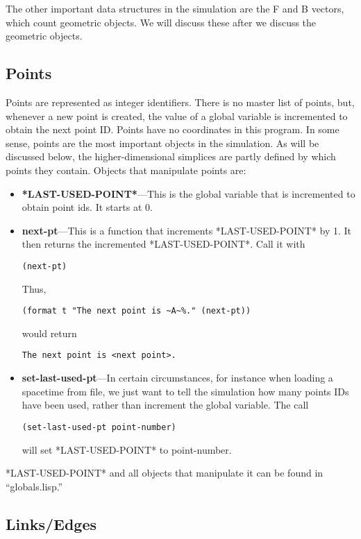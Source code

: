 \documentclass[12pt]{article}
\begin{document}
The other important data structures in the simulation are the F and B
vectors, which count geometric objects. We will discuss these after we
discuss the geometric objects.

\subsection{Points}
\label{ss:points}

Points are represented as integer identifiers. There is no master list
of points, but, whenever a new point is created, the value of a global
variable is incremented to obtain the next point ID. Points have no
coordinates in this program. In some sense, points are the most
important objects in the simulation. As will be discussed below, the
higher-dimensional simplices are partly defined by which points they
contain. Objects that manipulate points are:
\begin{itemize}
\item \textbf{*LAST-USED-POINT*}---This is the global variable that is
  incremented to obtain point ids. It starts at 0.
\item \textbf{next-pt}---This is a function that increments
  *LAST-USED-POINT* by 1. It then returns the incremented
  *LAST-USED-POINT*. Call it with
\begin{lstlisting}
(next-pt)
\end{lstlisting}
Thus, 
\begin{lstlisting}
(format t "The next point is ~A~%." (next-pt))
\end{lstlisting}
would return 
\begin{verbatim}
The next point is <next point>.
\end{verbatim}
\item \textbf{set-last-used-pt}---In certain circumstances, for
  instance when loading a spacetime from file, we just want to tell
  the simulation how many points IDs have been used, rather than
  increment the global variable. The call
\begin{lstlisting}
(set-last-used-pt point-number)
\end{lstlisting}
will set *LAST-USED-POINT* to point-number.
\end{itemize}

*LAST-USED-POINT* and all objects that manipulate it can be found in ``globals.lisp.''

\subsection{Links/Edges}
\end{document}
